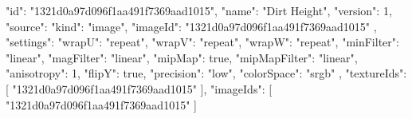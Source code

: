 {
  "id": "1321d0a97d096f1aa491f7369aad1015",
  "name": "Dirt Height",
  "version": 1,
  "source": {
    "kind": "image",
    "imageId": "1321d0a97d096f1aa491f7369aad1015"
  },
  "settings": {
    "wrapU": "repeat",
    "wrapV": "repeat",
    "wrapW": "repeat",
    "minFilter": "linear",
    "magFilter": "linear",
    "mipMap": true,
    "mipMapFilter": "linear",
    "anisotropy": 1,
    "flipY": true,
    "precision": "low",
    "colorSpace": "srgb"
  },
  "textureIds": [
    "1321d0a97d096f1aa491f7369aad1015"
  ],
  "imageIds": [
    "1321d0a97d096f1aa491f7369aad1015"
  ]
}
